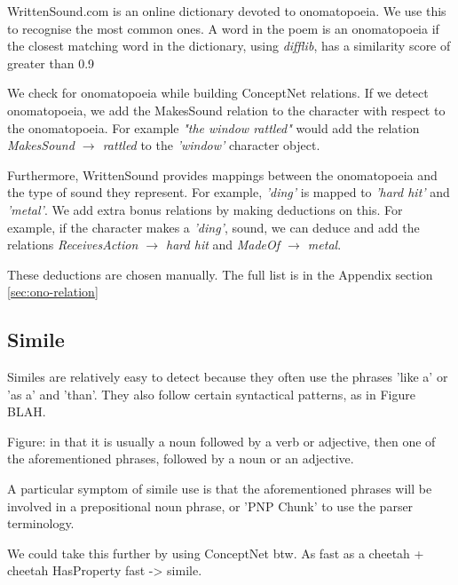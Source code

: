 WrittenSound.com is an online dictionary devoted to onomatopoeia. We use this to recognise the most common ones. A word in the poem is an onomatopoeia if the closest matching word in the dictionary, using \textit{difflib}, has a similarity score of greater than 0.9

We check for onomatopoeia while building ConceptNet relations. If we detect onomatopoeia, we add the MakesSound relation to the character with respect to the onomatopoeia. For example \textit{"the window rattled"} would add the relation \textit{MakesSound $\rightarrow$ rattled} to the \textit{'window'} character object.

Furthermore, WrittenSound provides mappings between the onomatopoeia and the type of sound they represent. For example, \textit{'ding'} is mapped to \textit{'hard hit'} and \textit{'metal'}. We add extra bonus relations by making deductions on this. For example, if the character makes a \textit{'ding'}, sound, we can deduce and add the relations \textit{ReceivesAction $\rightarrow$ hard hit} and \textit{MadeOf $\rightarrow$ metal}.

These deductions are chosen manually. The full list is in the Appendix section \ref{sec:ono-relation}


\subsection{Simile}

Similes are relatively easy to detect because they often use the phrases 'like a' or 'as a' and 'than'. They also follow certain syntactical patterns, as in Figure BLAH.

Figure: in that it is usually a noun followed by a verb or adjective, then one of the aforementioned phrases, followed by a noun or an adjective.

A particular symptom of simile use is that the aforementioned phrases will be involved in a prepositional noun phrase, or 'PNP Chunk' to use the parser terminology.

We could take this further by using ConceptNet btw. As fast as a cheetah + cheetah HasProperty fast -> simile.




